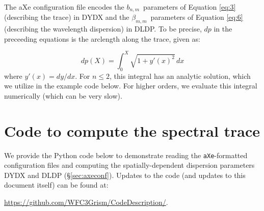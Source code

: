 \documentclass[preprint]{aastex}
\begin{document}
The aXe configuration file encodes the $b_{n,m}$\ parameters of Equation \ref{eq:3} (describing the trace) in DYDX and the $\beta_{m,m}$\ parameters of Equation \ref{eq:6} (describing the wavelength dispersion) in DLDP.  To be precise, $dp$ in the preceeding equations is the arclength along the trace, given as:

\begin{dmath}
dp(X) = \int_{0}^{X} \sqrt{1+y'(x)^2}\, dx
\label{eq:dldp}
\end{dmath}
where $y'(x) = dy/dx$.  For $n\leq2$, this integral has an analytic solution, which we 
utilize in the example code below.  For higher orders, we evaluate this integral numerically (which 
can be very slow).





\section{Code to compute the spectral trace}\label{sec:examplecode}
We provide the Python code below to demonstrate reading the \texttt{aXe}-formatted configuration files and computing the spatially-dependent dispersion parameters DYDX and DLDP (\S\ref{sec:axeconf}).  Updates to the code (and updates to this document itself) can be found at: 
\begin{center}
\url{https://github.com/WFC3Grism/CodeDescription/}.
\end{center}


\end{document}
